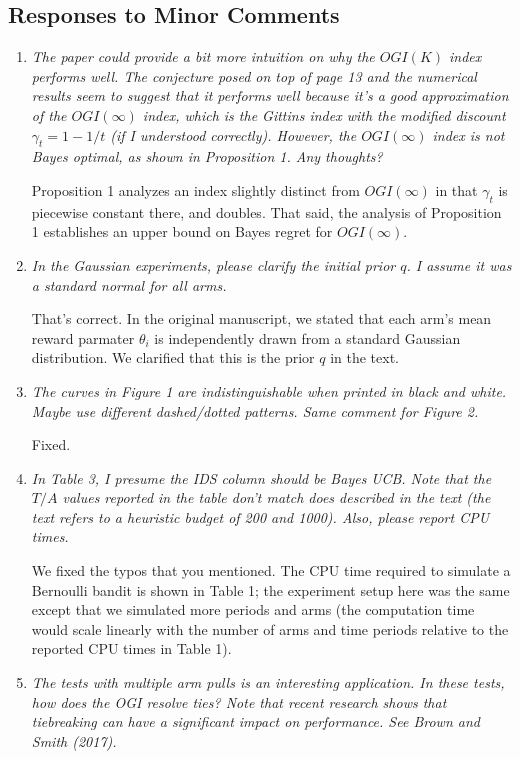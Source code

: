 \documentclass[11pt]{article}
\newcommand{\1}{\ensuremath{\mathbf{1}}} %
\theoremstyle{thm-sf}
\begin{document}
	\subsection{Responses to Minor Comments}
	
	\begin{enumerate}
		\item  {\it The paper could provide a bit more intuition on why the $OGI(K)$ index performs well. The conjecture posed on top of page 13 and the numerical results seem to suggest that it performs well because it's a good approximation of the $OGI(\infty)$ index, which is the Gittins index with the modified discount $\gamma_t = 1 - 1/t$ (if I understood correctly). However, the $OGI(\infty)$ index is not Bayes optimal, as shown in Proposition 1. Any thoughts?}
		
		Proposition 1 analyzes an index slightly distinct from $OGI(\infty)$ in that $\gamma_t$ is piecewise constant there, and doubles. That said, the analysis of Proposition 1 establishes an upper bound on Bayes regret for $OGI(\infty)$. 
		
		\item {\it In the Gaussian experiments, please clarify the initial prior $q$. I assume it was a standard normal for all arms.}
		
		That's correct. In the original manuscript, we stated that each arm's mean reward parmater $\theta_i$ is independently drawn from a standard Gaussian distribution. We clarified that this is the prior $q$ in the text.
		\item {\it The curves in Figure 1 are indistinguishable when printed in black and white. Maybe use different dashed/dotted patterns. Same comment for Figure 2.}
		
		Fixed.
		
		\item {\it In Table 3, I presume the IDS column should be Bayes UCB. Note that the $T/A$ values reported in the table don't match does described in the text (the text refers to a heuristic budget of 200 and 1000). Also, please report CPU times.}
		
		We fixed the typos that you mentioned. The CPU time required to simulate a Bernoulli bandit is shown in Table 1; the experiment setup here was the same except that we simulated more periods and arms (the computation time would scale linearly with the number of arms and time periods relative to the reported CPU times in Table 1).
		\item {\it The tests with multiple arm pulls is an interesting application. In these tests, how does the OGI resolve ties? Note that recent research shows that tiebreaking can have a significant impact on performance. See Brown and Smith (2017).}
		

\end{enumerate}
\end{document}
